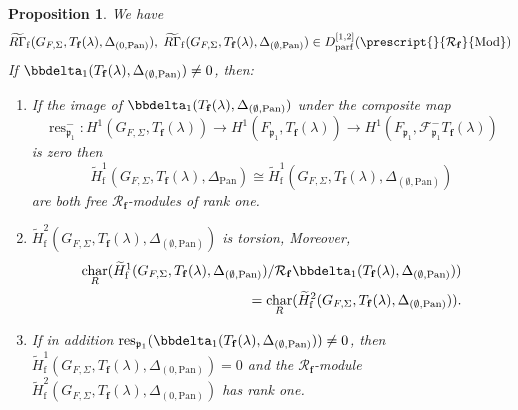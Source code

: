 \documentclass[10pt]{amsart}
\numberwithin{equation}{section}
\newtheorem{prop}[thm]{Proposition}
\theoremstyle{definition}
\theoremstyle{remark} %
\DeclareMathOperator{\Char}{char}
\newcommand{\pan}{\mathrm{Pan}}
\DeclareMathOperator{\res}{res}
\newcommand{\f}{\mathbf{f}}
\newcommand{\scrF}{\mathscr{F}}
\newcommand{\p}{\mathfrak{p}}
\newcommand{\R}{\mathcal{R}}
\begin{document}
		\begin{prop} We have
			$$\widetilde{R\Gamma}_{\mathrm{f}}(G_{F,\Sigma},T_\f(\lambda), \Delta_{(0,\pan)}), \; \widetilde{R\Gamma}_{\mathrm{f}}(G_{F,\Sigma},T_\f(\lambda), \Delta_{(\emptyset,\pan)}) \in D_{\mathrm{parf}}^{[1,2]}(\prescript{}{\R_\f}{\mathrm{Mod}})$$
			If $\bbdelta_1(T_\f(\lambda), \Delta_{(\emptyset,\pan)}) \neq 0$, then:
			\begin{enumerate}
				\item If the image of $\bbdelta_1(T_\f(\lambda), \Delta_{(\emptyset,\pan)})$ under the composite map 
				$$  \res_{\p_1}^-  \colon H^1(G_{F, \Sigma}, T_\f(\lambda)) \rightarrow H^1(F_{\p_1}, T_\f(\lambda)) \rightarrow  H^1(F_{\p_1}, \scrF^-_{\p_1} T_\f(\lambda)) $$ is zero then $$ \widetilde{H}^1_{\mathrm{f}}(G_{F,\Sigma},T_\f(\lambda),\Delta_{\pan}) \cong \widetilde{H}^1_{\mathrm{f}}(G_{F,\Sigma},T_\f(\lambda),\Delta_{(\emptyset,\pan)}) $$ are both free $ \R_{\f} $-modules of rank one. 
				\item $\widetilde{H}^2_{\mathrm{f}}(G_{F,\Sigma},T_\f(\lambda),\Delta_{(\emptyset,\pan)})$ is torsion, Moreover,
				\begin{align}
					\begin{aligned}
						\Char_R(\widetilde{H}^1_{\mathrm{f}}(G_{F,\Sigma},T_\f(\lambda),\Delta_{(\emptyset,\pan)})/\R_{\f}\bbdelta_1(T_\f(\lambda), \Delta_{(\emptyset,\pan)})) \\ \noindent = \Char_R(\widetilde{H}^2_{\mathrm{f}}(G_{F,\Sigma},T_\f(\lambda),\Delta_{(\emptyset,\pan)})) .
					\end{aligned}
				\end{align}
				\item If in addition $ \res_{\p_1}(\bbdelta_1(T_\f(\lambda), \Delta_{(\emptyset,\pan)})) \ne 0 $, then $ \widetilde{H}^1_{\mathrm{f}}(G_{F,\Sigma},T_\f(\lambda),\Delta_{(0,\pan)}) = 0 $ and the $ \R_{\f} $-module $  \widetilde{H}^2_{\mathrm{f}}(G_{F,\Sigma},T_\f(\lambda),\Delta_{(0,\pan)}) $ has rank one.
			\end{enumerate}
		\end{prop}
\end{document}
